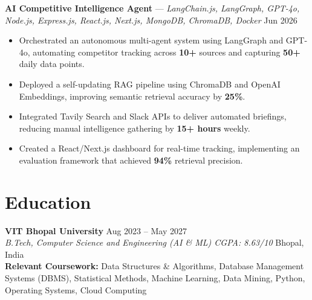 \documentclass[10pt,letterpaper]{article}
\begin{document}
\vspace{2.5pt}

\textbf{AI Competitive Intelligence Agent} --- \textit{LangChain.js, LangGraph, GPT-4o, Node.js, Express.js, React.js, Next.js, MongoDB, ChromaDB, Docker} \hfill {\small Jun 2026}
\begin{itemize}
  \item Orchestrated an autonomous multi-agent system using LangGraph and GPT-4o, automating competitor tracking across \textbf{10+} sources and capturing \textbf{50+} daily data points.
  \item Deployed a self-updating RAG pipeline using ChromaDB and OpenAI Embeddings, improving semantic retrieval accuracy by \textbf{25\%}.
  \item Integrated Tavily Search and Slack APIs to deliver automated briefings, reducing manual intelligence gathering by \textbf{15+ hours} weekly.
  \item Created a React/Next.js dashboard for real-time tracking, implementing an evaluation framework that achieved \textbf{94\%} retrieval precision.
\end{itemize}

\vspace{3pt}

\section{Education}

\textbf{VIT Bhopal University} \hfill {\small Aug 2023 -- May 2027}\\
\textit{B.Tech, Computer Science and Engineering (AI \& ML) \textbar{} CGPA: 8.63/10} \hfill {\small Bhopal, India}\\[1.5pt]
{\small \textbf{Relevant Coursework:} Data Structures \& Algorithms, Database Management Systems (DBMS), Statistical Methods, Machine Learning, Data Mining, Python, Operating Systems, Cloud Computing}

\vspace{3pt}

\end{document}
